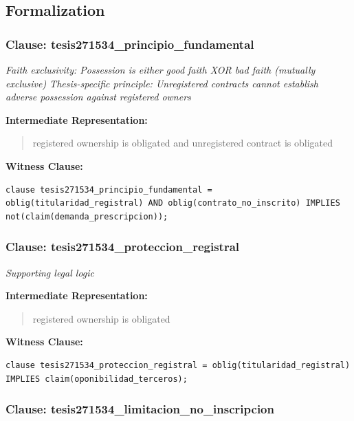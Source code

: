 \documentclass[11pt,a4paper]{article}
\begin{document}
\subsection{Formalization}

\subsubsection{Clause: tesis271534\_principio\_fundamental}

\textit{Faith exclusivity: Possession is either good faith XOR bad faith (mutually exclusive) Thesis-specific principle: Unregistered contracts cannot establish adverse possession against registered owners}

\textbf{Intermediate Representation:}

\begin{quote}
registered ownership is obligated and unregistered contract is obligated
\end{quote}

\textbf{Witness Clause:}

\begin{lstlisting}[style=witnessstyle, language=Witness]
clause tesis271534_principio_fundamental = oblig(titularidad_registral) AND oblig(contrato_no_inscrito) IMPLIES not(claim(demanda_prescripcion));
\end{lstlisting}

\subsubsection{Clause: tesis271534\_proteccion\_registral}

\textit{Supporting legal logic}

\textbf{Intermediate Representation:}

\begin{quote}
registered ownership is obligated
\end{quote}

\textbf{Witness Clause:}

\begin{lstlisting}[style=witnessstyle, language=Witness]
clause tesis271534_proteccion_registral = oblig(titularidad_registral) IMPLIES claim(oponibilidad_terceros);
\end{lstlisting}

\subsubsection{Clause: tesis271534\_limitacion\_no\_inscripcion}
\end{document}
